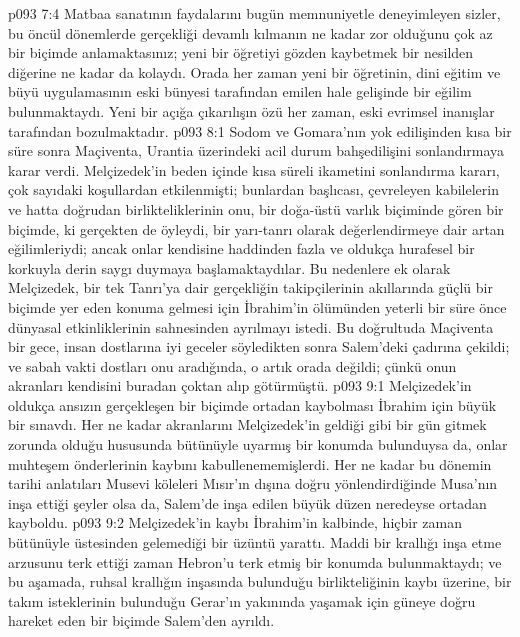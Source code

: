 \vs p093 7:4 Matbaa sanatının faydalarını bugün memnuniyetle deneyimleyen sizler, bu öncül dönemlerde gerçekliği devamlı kılmanın ne kadar zor olduğunu çok az bir biçimde anlamaktasınız; yeni bir öğretiyi gözden kaybetmek bir nesilden diğerine ne kadar da kolaydı. Orada her zaman yeni bir öğretinin, dini eğitim ve büyü uygulamasının eski bünyesi tarafından emilen hale gelişinde bir eğilim bulunmaktaydı. Yeni bir açığa çıkarılışın özü her zaman, eski evrimsel inanışlar tarafından bozulmaktadır.
\vs p093 8:1 Sodom ve Gomara’nın yok edilişinden kısa bir süre sonra Maçiventa, Urantia üzerindeki acil durum bahşedilişini sonlandırmaya karar verdi. Melçizedek’in beden içinde kısa süreli ikametini sonlandırma kararı, çok sayıdaki koşullardan etkilenmişti; bunlardan başlıcası, çevreleyen kabilelerin ve hatta doğrudan birlikteliklerinin onu, bir doğa\hyp{}üstü varlık biçiminde gören bir biçimde, ki gerçekten de öyleydi, bir yarı\hyp{}tanrı olarak değerlendirmeye dair artan eğilimleriydi; ancak onlar kendisine haddinden fazla ve oldukça hurafesel bir korkuyla derin saygı duymaya başlamaktaydılar. Bu nedenlere ek olarak Melçizedek, bir tek Tanrı’ya dair gerçekliğin takipçilerinin akıllarında güçlü bir biçimde yer eden konuma gelmesi için İbrahim’in ölümünden yeterli bir süre önce dünyasal etkinliklerinin sahnesinden ayrılmayı istedi. Bu doğrultuda Maçiventa bir gece, insan dostlarına iyi geceler söyledikten sonra Salem’deki çadırına çekildi; ve sabah vakti dostları onu aradığında, o artık orada değildi; çünkü onun akranları kendisini buradan çoktan alıp götürmüştü.
\vs p093 9:1 Melçizedek’in oldukça ansızın gerçekleşen bir biçimde ortadan kaybolması İbrahim için büyük bir sınavdı. Her ne kadar akranlarını Melçizedek’in geldiği gibi bir gün gitmek zorunda olduğu hususunda bütünüyle uyarmış bir konumda bulunduysa da, onlar muhteşem önderlerinin kaybını kabullenememişlerdi. Her ne kadar bu dönemin tarihi anlatıları Musevi köleleri Mısır’ın dışına doğru yönlendirdiğinde Musa’nın inşa ettiği şeyler olsa da, Salem’de inşa edilen büyük düzen neredeyse ortadan kayboldu.
\vs p093 9:2 Melçizedek’in kaybı İbrahim’in kalbinde, hiçbir zaman bütünüyle üstesinden gelemediği bir üzüntü yarattı. Maddi bir krallığı inşa etme arzusunu terk ettiği zaman Hebron’u terk etmiş bir konumda bulunmaktaydı; ve bu aşamada, ruhsal krallığın inşasında bulunduğu birlikteliğinin kaybı üzerine, bir takım isteklerinin bulunduğu Gerar’ın yakınında yaşamak için güneye doğru hareket eden bir biçimde Salem’den ayrıldı.
